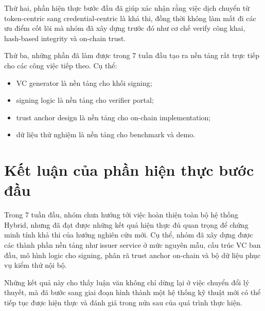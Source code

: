 Thứ hai, phần hiện thực bước đầu đã giúp xác nhận rằng việc dịch chuyển từ token-centric sang credential-centric là khả thi, đồng thời không làm mất đi các ưu điểm cốt lõi mà nhóm đã xây dựng trước đó như cơ chế verify công khai, hash-based integrity và on-chain trust.

Thứ ba, những phần đã làm được trong 7 tuần đầu tạo ra nền tảng rất trực tiếp cho các công việc tiếp theo. Cụ thể:
\begin{itemize}
    \item VC generator là nền tảng cho khối signing;
    \item signing logic là nền tảng cho verifier portal;
    \item trust anchor design là nền tảng cho on-chain implementation;
    \item dữ liệu thử nghiệm là nền tảng cho benchmark và demo.
\end{itemize}

\section{Kết luận của phần hiện thực bước đầu}

Trong 7 tuần đầu, nhóm chưa hướng tới việc hoàn thiện toàn bộ hệ thống Hybrid, nhưng đã đạt được những kết quả hiện thực đủ quan trọng để chứng minh tính khả thi của hướng nghiên cứu mới. Cụ thể, nhóm đã xây dựng được các thành phần nền tảng như issuer service ở mức nguyên mẫu, cấu trúc VC ban đầu, mô hình logic cho signing, phân rã trust anchor on-chain và bộ dữ liệu phục vụ kiểm thử nội bộ. 

Những kết quả này cho thấy luận văn không chỉ dừng lại ở việc chuyển đổi lý thuyết, mà đã bước sang giai đoạn hình thành một hệ thống kỹ thuật mới có thể tiếp tục được hiện thực và đánh giá trong nửa sau của quá trình thực hiện.